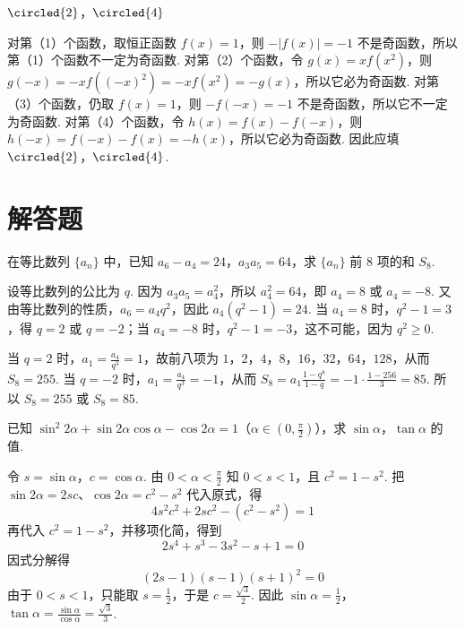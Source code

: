 \begin{answer}
\(\circled{2}\)，\(\circled{4}\)
\end{answer}

\begin{solution}
对第（1）个函数，取恒正函数 \(f(x)=1\)，则 \(-|f(x)|=-1\) 不是奇函数，所以第（1）个函数不一定为奇函数. 对第（2）个函数，令 \(g(x)=xf(x^2)\)，则 \(g(-x)=-xf((-x)^2)=-xf(x^2)=-g(x)\)，所以它必为奇函数. 对第（3）个函数，仍取 \(f(x)=1\)，则 \(-f(-x)=-1\) 不是奇函数，所以它不一定为奇函数. 对第（4）个函数，令 \(h(x)=f(x)-f(-x)\)，则 \(h(-x)=f(-x)-f(x)=-h(x)\)，所以它必为奇函数. 因此应填 \(\circled{2}\)，\(\circled{4}\).
\end{solution}

\section{解答题}
\begin{problem}
在等比数列 \(\{a_{n}\}\) 中，已知 \(a_6 - a_4 = 24\)，\(a_3a_5 = 64\)，求 \(\{a_{n}\}\) 前 \(8\) 项的和 \(S_{8}\).
\end{problem}

\begin{solution}
设等比数列的公比为 \(q\). 因为 \(a_3a_5=a_4^2\)，所以 \(a_4^2=64\)，即 \(a_4=8\) 或 \(a_4=-8\). 又由等比数列的性质，\(a_6=a_4q^2\)，因此
\(a_4(q^2-1)=24\).
当 \(a_4=8\) 时，\(q^2-1=3\)，得 \(q=2\) 或 \(q=-2\)；当 \(a_4=-8\) 时，\(q^2-1=-3\)，这不可能，因为 \(q^2\geqslant0\).

当 \(q=2\) 时，\(a_1=\frac{a_4}{q^3}=1\)，故前八项为 \(1\)，\(2\)，\(4\)，\(8\)，\(16\)，\(32\)，\(64\)，\(128\)，从而 \(S_8=255\). 当 \(q=-2\) 时，\(a_1=\frac{a_4}{q^3}=-1\)，从而
\(S_8=a_1\frac{1-q^8}{1-q}=-1\cdot\frac{1-256}{3}=85\).
所以 \(S_8=255\) 或 \(S_8=85\).
\end{solution}

\begin{problem}
已知 \(\sin^2 2\alpha + \sin 2\alpha \cos \alpha - \cos 2\alpha = 1\)（\(\alpha \in \left(0, \frac{\pi}{2}\right)\)），求 \(\sin \alpha\)，\(\tan \alpha\) 的值.
\end{problem}

\begin{solution}
令 \(s=\sin\alpha\)，\(c=\cos\alpha\). 由 \(0<\alpha<\frac{\pi}{2}\) 知 \(0<s<1\)，且 \(c^2=1-s^2\). 把 \(\sin2\alpha=2sc\)、\(\cos2\alpha=c^2-s^2\) 代入原式，得
\[
4s^2c^2+2sc^2-(c^2-s^2)=1
\]
再代入 \(c^2=1-s^2\)，并移项化简，得到
\[
2s^4+s^3-3s^2-s+1=0
\]
因式分解得
\[
(2s-1)(s-1)(s+1)^2=0
\]
由于 \(0<s<1\)，只能取 \(s=\frac{1}{2}\)，于是 \(c=\frac{\sqrt{3}}{2}\). 因此 \(\sin\alpha=\frac{1}{2}\)，\(\tan\alpha=\frac{\sin\alpha}{\cos\alpha}=\frac{\sqrt{3}}{3}\).
\end{solution}

